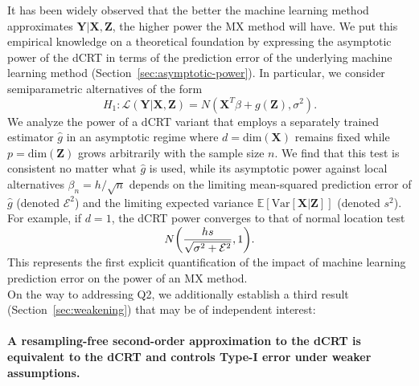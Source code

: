 \documentclass[ejs]{imsart}
\numberwithin{equation}{section}
\theoremstyle{plain}
\theoremstyle{definition}
\theoremstyle{remark}
\newcommand{\prx}{\bm X}
\newcommand{\prz}{\bm Z}
\newcommand{\pry}{{\bm Y}}
\begin{document}
It has been widely observed that the better the machine learning method approximates $\pry|\prx,\prz$, the higher power the MX method will have. We put this empirical knowledge on a theoretical foundation by expressing the asymptotic power of the dCRT in terms of the prediction error of the underlying machine learning method (Section~\ref{sec:asymptotic-power}). In particular, we consider semiparametric alternatives of the form
\begin{equation}
	H_1: \mathcal L(\pry|\prx,\prz) = N(\prx^T\beta + g(\prz),\sigma^2).
	\label{parametric-alternative-intro}
\end{equation}
We analyze the power of a dCRT variant that employs a separately trained estimator $\widehat g$ in an asymptotic regime where $d = \text{dim}(\prx)$ remains fixed while $p = \text{dim}(\prz)$ grows arbitrarily with the sample size $n$. We find that this test is consistent no matter what $\widehat g$ is used, while its asymptotic power against local alternatives $\beta_n = h/\sqrt{n}$ depends on the limiting mean-squared prediction error of $\widehat g$ (denoted $\mathcal E^2$) and the limiting expected variance $\mathbb E[\text{Var}[\prx | \prz]]$ (denoted $s^2$). For example, if $d = 1$, the dCRT power converges to that of normal location test
\begin{equation*}
N\smash{\left(\frac{hs}{\sqrt{\sigma^2 + \mathcal E^2}},1\right)}.
\end{equation*}
This represents the first explicit quantification of the impact of machine learning prediction error on the power of an MX method. \\

On the way to addressing Q2, we additionally establish a third result (Section~\ref{sec:weakening}) that may be of independent interest:

\paragraph{A resampling-free second-order approximation to the dCRT is equivalent to the dCRT and controls Type-I error under weaker assumptions.}
\end{document}
